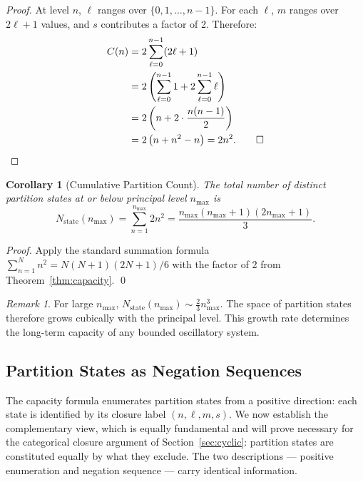 \documentclass[twocolumn,10pt,a4paper]{article}
\theoremstyle{thmstyle}
\newtheorem{corollary}[theorem]{Corollary}
\theoremstyle{definition}
\theoremstyle{remark}
\newtheorem{remark}[theorem]{Remark}
\newcommand{\Nstate}{N_{\mathrm{state}}}
\begin{document}
\begin{proof}
At level $n$, $\ell$ ranges over $\{0, 1, \ldots, n-1\}$. For each $\ell$, $m$ ranges over $2\ell + 1$ values, and $s$ contributes a factor of 2. Therefore:
\begin{align}
    C(n) &= 2 \sum_{\ell=0}^{n-1} (2\ell + 1) \notag \\
         &= 2 \left( \sum_{\ell=0}^{n-1} 1 + 2\sum_{\ell=0}^{n-1}\ell \right) \notag \\
         &= 2 \left( n + 2 \cdot \frac{n(n-1)}{2} \right) \notag \\
         &= 2 \left( n + n^2 - n \right) = 2n^2. \qed
\end{align}
\end{proof}

\begin{corollary}[Cumulative Partition Count]
\label{cor:cumulative}
The total number of distinct partition states at or below principal level $n_{\max}$ is
\begin{equation}
    \Nstate(n_{\max}) = \sum_{n=1}^{n_{\max}} 2n^2 = \frac{n_{\max}(n_{\max}+1)(2n_{\max}+1)}{3}.
    \label{eq:cumulative}
\end{equation}
\end{corollary}

\begin{proof}
Apply the standard summation formula $\sum_{n=1}^{N} n^2 = N(N+1)(2N+1)/6$ with the factor of 2 from Theorem~\ref{thm:capacity}. \qed
\end{proof}

\begin{remark}
For large $n_{\max}$, $\Nstate(n_{\max}) \sim \frac{2}{3} n_{\max}^3$. The space of partition states therefore grows cubically with the principal level. This growth rate determines the long-term capacity of any bounded oscillatory system.
\end{remark}

\subsection{Partition States as Negation Sequences}
\label{sec:negation}

The capacity formula enumerates partition states from a positive direction: each state is identified by its closure label $(n, \ell, m, s)$. We now establish the complementary view, which is equally fundamental and will prove necessary for the categorical closure argument of Section~\ref{sec:cyclic}: partition states are constituted equally by what they exclude. The two descriptions --- positive enumeration and negation sequence --- carry identical information.
\end{document}
